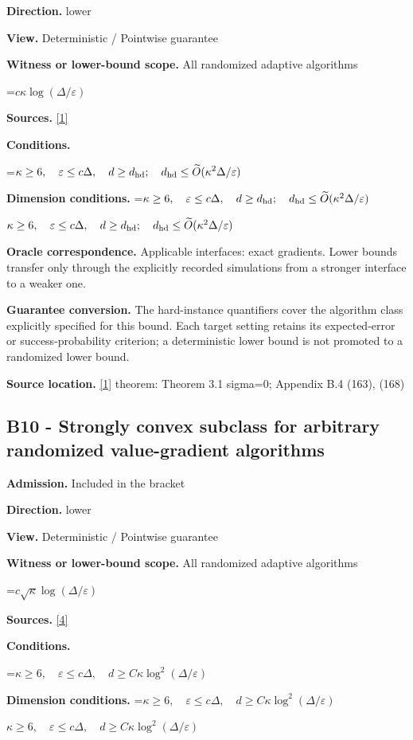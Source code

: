 \documentclass[10pt,a4paper]{article}
\newcommand{\AtlasMath}[1]{\par\begingroup\centering\setbox0=\hbox{$\displaystyle #1$}\ifdim\wd0>1.4\linewidth\typeout{ATLAS WIDE FORMULA: \the\wd0}\fi\ifdim\wd0>\linewidth\resizebox{\linewidth}{!}{\box0}\else\box0\fi\par\endgroup}
\newcommand{\AtlasInlineMath}[1]{\begingroup\setbox0=\hbox{$#1$}\ifdim\wd0>.4\linewidth\endgroup\AtlasMath{#1}\else\endgroup$#1$\fi}
\begin{document}
\textbf{Direction.} lower

\textbf{View.} Deterministic / Pointwise guarantee

\textbf{Witness or lower-bound scope.} All randomized adaptive algorithms

\AtlasMath{c\kappa\log(\Delta/\varepsilon)}
\textbf{Sources.} \href{https://arxiv.org/pdf/2609.03990}{[1]}

\textbf{Conditions.} 
\AtlasMath{\kappa\ge6,\quad\varepsilon\le c\Delta,\quad d\ge d_{\rm hd};\quad d_{\rm hd}\le\widetilde{O}(\kappa^2\Delta/\varepsilon)}


\textbf{Dimension conditions.} \AtlasInlineMath{\kappa\ge6,\quad\varepsilon\le c\Delta,\quad d\ge d_{\rm hd};\quad d_{\rm hd}\le\widetilde{O}(\kappa^2\Delta/\varepsilon)}

\textbf{Oracle correspondence.} Applicable interfaces: exact gradients. Lower bounds transfer only through the explicitly recorded simulations from a stronger interface to a weaker one.

\textbf{Guarantee conversion.} The hard-instance quantifiers cover the algorithm class explicitly specified for this bound. Each target setting retains its expected-error or success-probability criterion; a deterministic lower bound is not promoted to a randomized lower bound.

\textbf{Source location.} \href{https://arxiv.org/pdf/2609.03990}{[1]} theorem: Theorem 3.1 sigma=0; Appendix B.4 (163), (168)

\subsection{B10 - Strongly convex subclass for arbitrary randomized value-gradient algorithms}
\textbf{Admission.} Included in the bracket

\textbf{Direction.} lower

\textbf{View.} Deterministic / Pointwise guarantee

\textbf{Witness or lower-bound scope.} All randomized adaptive algorithms

\AtlasMath{c\sqrt\kappa\log(\Delta/\varepsilon)}
\textbf{Sources.} \href{https://arxiv.org/pdf/2609.10874}{[4]}

\textbf{Conditions.} 
\AtlasMath{\kappa\ge6,\quad\varepsilon\le c\Delta,\quad d\ge C\kappa\log^2(\Delta/\varepsilon)}


\textbf{Dimension conditions.} \AtlasInlineMath{\kappa\ge6,\quad\varepsilon\le c\Delta,\quad d\ge C\kappa\log^2(\Delta/\varepsilon)}
\end{document}

